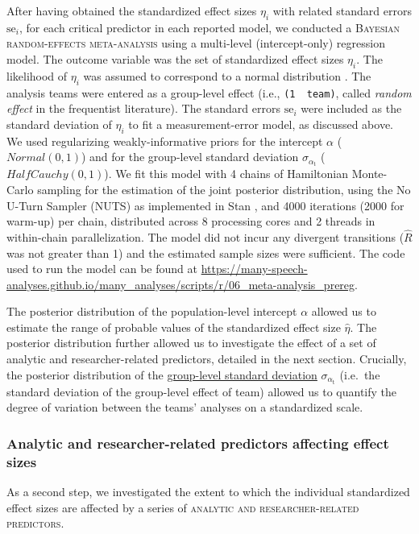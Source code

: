 \documentclass[Review,times,sageh]{sagej}
\begin{document}
After having obtained the standardized effect sizes \(\eta_i\) with related standard errors \(\text{se}_i\), for each critical predictor in each reported model, we conducted a \textsc{Bayesian random-effects meta-analysis} using a multi-level (intercept-only) regression model.
The outcome variable was the set of standardized effect sizes \(\eta_i\).
The likelihood of \(\eta_i\) was assumed to correspond to a normal distribution \citep{knight2000}.
The analysis teams were entered as a group-level effect (i.e., \texttt{(1\ \textbar{}\ team)}, called \emph{random effect} in the frequentist literature).
The standard errors \(\text{se}_i\) were included as the standard deviation of \(\eta_i\) to fit a measurement-error model, as discussed above.
We used regularizing weakly-informative priors for the intercept \(\alpha\) (\(Normal(0, 1)\)) and for the group-level standard deviation \(\sigma_{\alpha_{\text{t}}}\) (\(HalfCauchy(0, 1)\)).
We fit this model with 4 chains of Hamiltonian Monte-Carlo sampling for the estimation of the joint posterior distribution, using the No U-Turn Sampler (NUTS) as implemented in Stan \citep{stan2021}, and 4000 iterations (2000 for warm-up) per chain, distributed across 8 processing cores and 2 threads in within-chain parallelization.
The model did not incur any divergent transitions (\(\hat{R}\) was not greater than 1) and the estimated sample sizes were sufficient.
The code used to run the model can be found at \url{https://many-speech-analyses.github.io/many_analyses/scripts/r/06_meta-analysis_prereg}.

The posterior distribution of the population-level intercept \(\alpha\) allowed us to estimate the range of probable values of the standardized effect size \(\hat{\eta}\).
The posterior distribution further allowed us to investigate the effect of a set of analytic and researcher-related predictors, detailed in the next section.
Crucially, the posterior distribution of the \href{.smallcaps}{group-level standard deviation} \(\sigma_{\alpha_{\text{t}}}\) (i.e.~the standard deviation of the group-level effect of team) allowed us to quantify the degree of variation between the teams' analyses on a standardized scale.

\hypertarget{anares-preds}{%
\subsubsection{Analytic and researcher-related predictors affecting effect sizes}\label{anares-preds}}

As a second step, we investigated the extent to which the individual standardized effect sizes are affected by a series of \textsc{analytic and researcher-related predictors}.
\end{document}
